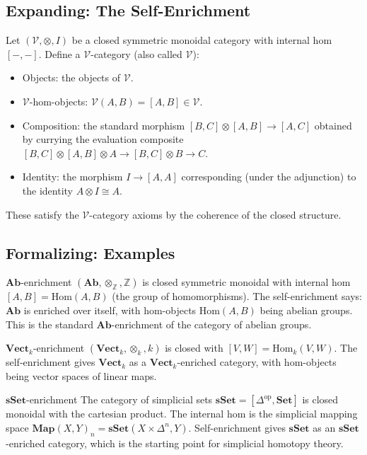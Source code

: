 \subsection{Expanding: The Self-Enrichment}

Let $(\mathcal{V}, \otimes, I)$ be a closed symmetric monoidal category with
internal hom $[-, -]$. Define a $\mathcal{V}$-category (also called $\mathcal{V}$):
\begin{itemize}
  \item Objects: the objects of $\mathcal{V}$.
  \item $\mathcal{V}$-hom-objects: $\mathcal{V}(A, B) = [A, B] \in \mathcal{V}$.
  \item Composition: the standard morphism $[B,C] \otimes [A,B] \to [A,C]$
        obtained by currying the evaluation composite
        $[B,C] \otimes [A,B] \otimes A \to [B,C] \otimes B \to C$.
  \item Identity: the morphism $I \to [A,A]$ corresponding (under the adjunction)
        to the identity $A \otimes I \cong A$.
\end{itemize}
These satisfy the $\mathcal{V}$-category axioms by the coherence of the closed
structure.

\subsection{Formalizing: Examples}

\begin{example}{$\mathbf{Ab}$-enrichment}
$(\mathbf{Ab}, \otimes_\mathbb{Z}, \mathbb{Z})$ is closed symmetric monoidal
with internal hom $[A, B] = \mathrm{Hom}(A, B)$ (the group of homomorphisms).
The self-enrichment says: $\mathbf{Ab}$ is enriched over itself, with hom-objects
$\mathrm{Hom}(A, B)$ being abelian groups. This is the standard
$\mathbf{Ab}$-enrichment of the category of abelian groups.
\end{example}

\begin{example}{$\mathbf{Vect}_k$-enrichment}
$(\mathbf{Vect}_k, \otimes_k, k)$ is closed with $[V, W] = \mathrm{Hom}_k(V, W)$.
The self-enrichment gives $\mathbf{Vect}_k$ as a $\mathbf{Vect}_k$-enriched
category, with hom-objects being vector spaces of linear maps.
\end{example}

\begin{example}{$\mathbf{sSet}$-enrichment}
The category of simplicial sets $\mathbf{sSet} = [\Delta^{\mathrm{op}}, \mathbf{Set}]$
is closed monoidal with the cartesian product. The internal hom is the
simplicial mapping space $\mathbf{Map}(X, Y)_n = \mathbf{sSet}(X \times \Delta^n, Y)$.
Self-enrichment gives $\mathbf{sSet}$ as an $\mathbf{sSet}$-enriched category,
which is the starting point for simplicial homotopy theory.
\end{example}

